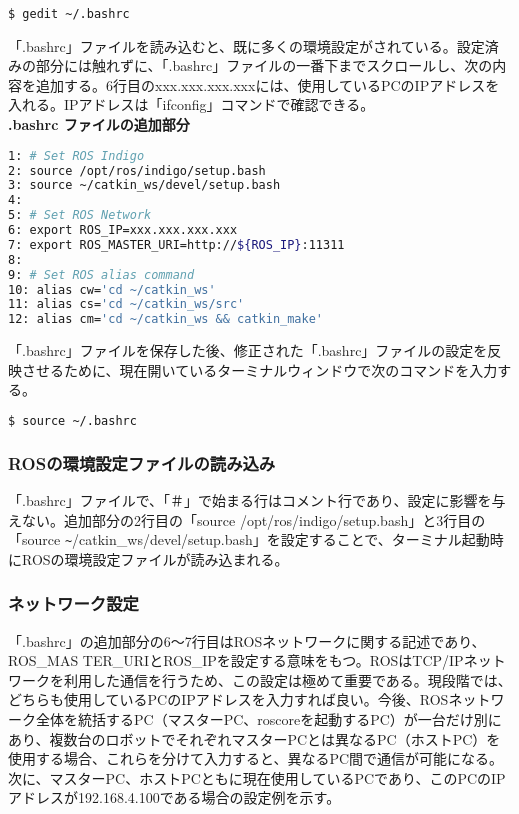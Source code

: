 \begin{lstlisting}[language=ROS]
$ gedit ~/.bashrc
\end{lstlisting}

「.bashrc」ファイルを読み込むと、既に多くの環境設定がされている。設定済みの部分には触れずに、「.bashrc」ファイルの一番下までスクロールし、次の内容を追加する。6行目のxxx.xxx.xxx.xxxには、使用しているPCのIPアドレスを入れる。IPアドレスは「ifconfig」コマンドで確認できる。\\

\noindent\textbf{.bashrc ファイルの追加部分}
\begin{lstlisting}[language=bash]
1: # Set ROS Indigo
2: source /opt/ros/indigo/setup.bash
3: source ~/catkin_ws/devel/setup.bash
4:
5: # Set ROS Network
6: export ROS_IP=xxx.xxx.xxx.xxx
7: export ROS_MASTER_URI=http://${ROS_IP}:11311
8:
9: # Set ROS alias command
10: alias cw='cd ~/catkin_ws'
11: alias cs='cd ~/catkin_ws/src'
12: alias cm='cd ~/catkin_ws && catkin_make'
\end{lstlisting}

「.bashrc」ファイルを保存した後、修正された「.bashrc」ファイルの設定を反映させるために、現在開いているターミナルウィンドウで次のコマンドを入力する。

\begin{lstlisting}[language=bash]
$ source ~/.bashrc
\end{lstlisting}

\subsubsection{ROSの環境設定ファイルの読み込み}

「.bashrc」ファイルで、「＃」で始まる行はコメント行であり、設定に影響を与えない。追加部分の2行目の「source /opt/ros/indigo/setup.bash」と3行目の「source \verb|~|/catkin\_ws/devel/setup.bash」を設定することで、ターミナル起動時にROSの環境設定ファイルが読み込まれる。

\subsubsection{ネットワーク設定}

「.bashrc」の追加部分の6～7行目はROSネットワークに関する記述であり、ROS\_MAS TER\_URIとROS\_IPを設定する意味をもつ。ROSはTCP/IPネットワークを利用した通信を行うため、この設定は極めて重要である。現段階では、どちらも使用しているPCのIPアドレスを入力すれば良い。今後、ROSネットワーク全体を統括するPC（マスターPC、roscoreを起動するPC）が一台だけ別にあり、複数台のロボットでそれぞれマスターPCとは異なるPC（ホストPC）を使用する場合、これらを分けて入力すると、異なるPC間で通信が可能になる。次に、マスターPC、ホストPCともに現在使用しているPCであり、このPCのIPアドレスが192.168.4.100である場合の設定例を示す。

